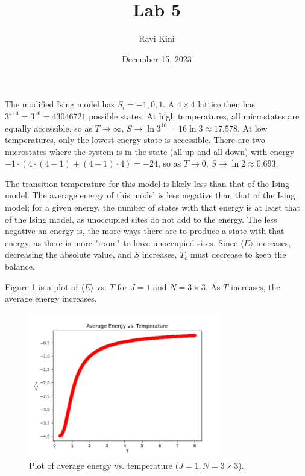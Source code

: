 \documentclass{article}
\title{Lab 5}
\author{Ravi Kini}
\date{December 15, 2023}
\begin{document}
\maketitle


\problem
The modified Ising model has $S_i = -1, 0, 1$. A $4 \times 4$ lattice then has $3^{4 \cdot 4} = 3^{16} = 43046721$ possible states. At high temperatures, all microstates are equally accessible, so as $T \to \infty$, $S \to \ln 3^{16} = 16\ln 3 \approx 17.578$. At low temperatures, only the lowest energy state is accessible. There are two microstates where the system is in the state (all up and all down) with energy $-1 \cdot \left(4 \cdot \left(4 - 1\right) + \left(4 - 1\right) \cdot 4\right) = -24$, so as $T \to 0$, $S \to \ln 2 \approx 0.693$.

\clearpage

\problem
The transition temperature for this model is likely less than that of the Ising model. The average energy of this model is less negative than that of the Ising model; for a given energy, the number of states with that energy is at least that of the Ising model, as unoccupied sites do not add to the energy. The less negative an energy is, the more ways there are to produce a state with that energy, as there is more "room" to have unoccupied sites. Since $\langle E\rangle$ increases, decreasing the absolute value, and $S$ increases, $T_c$ must decrease to keep the balance.

\clearpage

\problem
Figure \ref{fig:fig1} is a plot of $\langle E \rangle$ vs. $T$ for $J = 1$ and $N = 3 \times 3$. As $T$ increases, the average energy increases.
\begin{figure}[!htb]
    \centering
    \includegraphics[width=0.75\textwidth]{../code/phy112l_lab5/5-3.png}
    \caption{Plot of average energy vs. temperature ($J = 1, N = 3 \times 3$).}
    \label{fig:fig1}
\end{figure}
\end{document}
